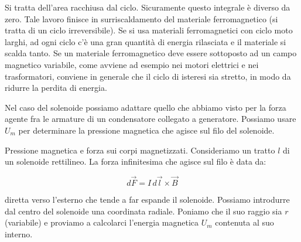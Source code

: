 Si tratta dell'area racchiusa dal ciclo. Sicuramente questo integrale è diverso da zero. Tale lavoro finisce in surriscaldamento del materiale ferromagnetico (si tratta di un ciclo irreversibile). Se si usa materiali ferromagnetici con ciclo moto larghi, ad ogni ciclo c'è una gran quantità di energia rilasciata e il materiale si scalda tanto. Se un materiale ferromagnetico deve essere sottoposto ad un campo magnetico variabile, come avviene ad esempio nei motori elettrici e nei trasformatori, conviene in generale che il ciclo di isteresi sia stretto, in modo da ridurre la perdita di energia.

Nel caso del solenoide possiamo adattare quello che abbiamo visto per la forza agente fra le armature di un condensatore collegato a generatore. Possiamo usare $U_m$ per determinare la pressione magnetica che agisce sul filo del solenoide.

Pressione magnetica e forza sui corpi magnetizzati. Consideriamo un tratto $l$ di un solenoide rettilineo. La forza infinitesima che agisce sul filo è data da:

\[
	d\vec{F} = I\,d\vec{l} \times \vec{B}
\]

diretta verso l'esterno che tende a far espande il solenoide. Possiamo introdurre dal centro del solenoide una coordinata radiale. Poniamo che il suo raggio sia $r$ (variabile) e proviamo a calcolarci l'energia magnetica $U_m$ contenuta al suo interno.

